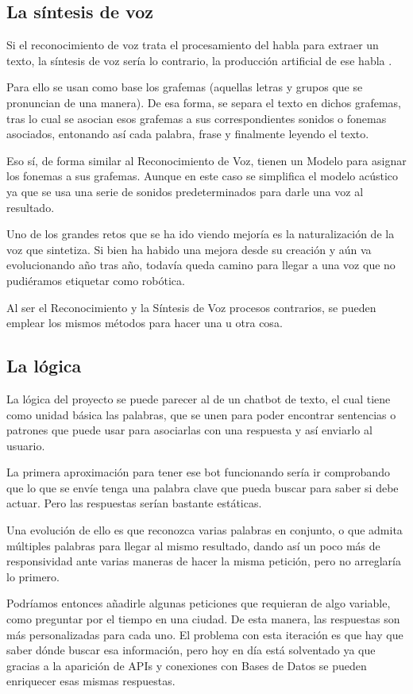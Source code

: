 \subsection{La síntesis de voz}
Si el reconocimiento de voz trata el procesamiento del habla para extraer un texto, la síntesis de voz sería lo contrario, la producción artificial de ese habla \cite{tts-definition}. 

Para ello se usan como base los grafemas (aquellas letras y grupos que se pronuncian de una manera). De esa forma, se separa el texto en dichos grafemas, tras lo cual se asocian esos grafemas a sus correspondientes sonidos o fonemas asociados, entonando así cada palabra, frase y finalmente leyendo el texto.

Eso sí, de forma similar al Reconocimiento de Voz, tienen un Modelo para asignar los fonemas a sus grafemas. Aunque en este caso se simplifica el modelo acústico ya que se usa una serie de sonidos predeterminados para darle una voz al resultado.

Uno de los grandes retos que se ha ido viendo mejoría es la naturalización de la voz que sintetiza. Si bien ha habido una mejora desde su creación y aún va evolucionando año tras año, todavía queda camino para llegar a una voz que no pudiéramos etiquetar como robótica.

Al ser el Reconocimiento y la Síntesis de Voz procesos contrarios, se pueden emplear los mismos métodos para hacer una u otra cosa.
 

\subsection{La lógica}

La lógica del proyecto se puede parecer al de un chatbot de texto, el cual tiene como unidad básica las palabras, que se unen para poder encontrar sentencias o patrones que puede usar para asociarlas con una respuesta y así enviarlo al usuario.

La primera aproximación para tener ese bot funcionando sería ir comprobando que lo que se envíe tenga una palabra clave que pueda buscar para saber si debe actuar. Pero las respuestas serían bastante estáticas.

Una evolución de ello es que reconozca varias palabras en conjunto, o que admita múltiples palabras para llegar al mismo resultado, dando así un poco más de responsividad ante varias maneras de hacer la misma petición, pero no arreglaría lo primero.

Podríamos entonces añadirle algunas peticiones que requieran de algo variable, como preguntar por el tiempo en una ciudad. De esta manera, las respuestas son más personalizadas para cada uno. El problema con esta iteración es que hay que saber dónde buscar esa información, pero hoy en día está solventado ya que gracias a la aparición de APIs y conexiones con Bases de Datos se pueden enriquecer esas mismas respuestas.

